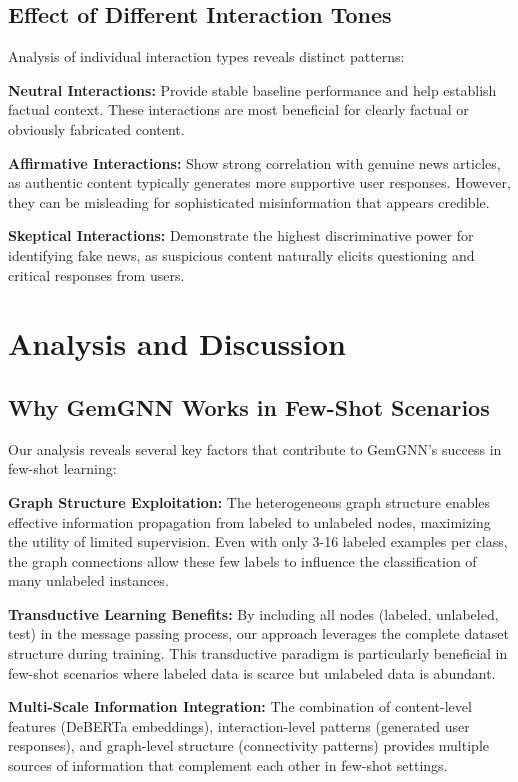 \subsection{Effect of Different Interaction Tones}

Analysis of individual interaction types reveals distinct patterns:

\textbf{Neutral Interactions:} Provide stable baseline performance and help establish factual context. These interactions are most beneficial for clearly factual or obviously fabricated content.

\textbf{Affirmative Interactions:} Show strong correlation with genuine news articles, as authentic content typically generates more supportive user responses. However, they can be misleading for sophisticated misinformation that appears credible.

\textbf{Skeptical Interactions:} Demonstrate the highest discriminative power for identifying fake news, as suspicious content naturally elicits questioning and critical responses from users.

\section{Analysis and Discussion}

\subsection{Why GemGNN Works in Few-Shot Scenarios}

Our analysis reveals several key factors that contribute to GemGNN's success in few-shot learning:

\textbf{Graph Structure Exploitation:} The heterogeneous graph structure enables effective information propagation from labeled to unlabeled nodes, maximizing the utility of limited supervision. Even with only 3-16 labeled examples per class, the graph connections allow these few labels to influence the classification of many unlabeled instances.

\textbf{Transductive Learning Benefits:} By including all nodes (labeled, unlabeled, test) in the message passing process, our approach leverages the complete dataset structure during training. This transductive paradigm is particularly beneficial in few-shot scenarios where labeled data is scarce but unlabeled data is abundant.

\textbf{Multi-Scale Information Integration:} The combination of content-level features (DeBERTa embeddings), interaction-level patterns (generated user responses), and graph-level structure (connectivity patterns) provides multiple sources of information that complement each other in few-shot settings.

